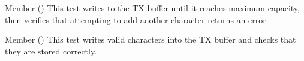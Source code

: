 \begin{DoxyRefList}
\item[Member \doxylink{test_8c_ab27d513a80c676725c0b6be80d6a27de}{test\+\_\+tx\+Char\+\_\+overflow} ()]\label{test__test000007}%
%
This test writes to the TX buffer until it reaches maximum capacity, then verifies that attempting to add another character returns an error.  
\item[Member \doxylink{test_8c_af6d3a81ea7fe9ab1b8a34a580a14c6a2}{test\+\_\+tx\+Char\+\_\+top} ()]\label{test__test000006}%
%
This test writes valid characters into the TX buffer and checks that they are stored correctly. 
\end{DoxyRefList}